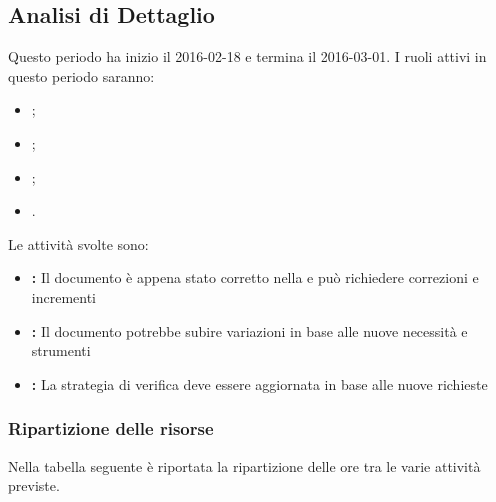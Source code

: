 \documentclass[12pt,a4paper]{article}
\begin{document}
\newpage

\subsection{Analisi di Dettaglio}
Questo periodo ha inizio il 2016-02-18 e termina il 2016-03-01. I ruoli attivi in questo periodo saranno:

\begin{itemize}
	\item \PM{};
	\item \AM{};
	\item \AN{};
	\item \VR{}.
\end{itemize}

Le attività svolte sono:

\begin{itemize}
	\item \textbf{\AdR{}:} 
	Il documento è appena stato corretto nella \RR{} e può richiedere correzioni e incrementi
	\item \textbf{\NdP{}:}
	Il documento potrebbe subire variazioni in base alle nuove necessità e strumenti
	\item \textbf{\PdQ{}:}
	La strategia di verifica deve essere aggiornata in base alle nuove richieste
\end{itemize}

\subsubsection{Ripartizione delle risorse}
Nella tabella seguente è riportata la ripartizione delle ore tra le varie attività previste.
\end{document}
